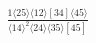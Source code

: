 \documentclass[varwidth, border=5pt]{standalone}
\begin{document}
\begin{my}
$\begin{gathered}
\scriptscriptstyle\frac{1⟨25⟩⟨12⟩[34]⟨45⟩}{⟨14⟩^2⟨24⟩⟨35⟩[45]}
\end{gathered}$
\end{my}
\end{document}
